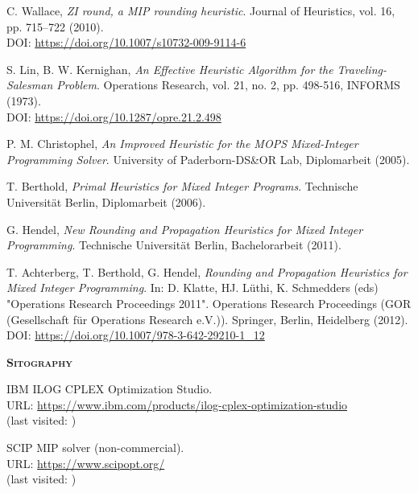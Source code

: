 \documentclass[a4paper,12pt]{book}
\begin{document}
\renewcommand{\listfigurename}{Figures}
\listoffigures
\renewcommand{\listtablename}{Tables}
\listoftables

\nocite{*}
\renewcommand{\bibname}{References}
\begin{thebibliography}{9}
	
	 C. Wallace, \textit{ZI round, a MIP rounding heuristic}. Journal of Heuristics, vol. 16, pp. 715–722 (2010). \\ DOI: \url{https://doi.org/10.1007/s10732-009-9114-6}

	 S. Lin, B. W. Kernighan, \textit{An Effective Heuristic Algorithm for the Traveling-Salesman Problem}. Operations Research, vol. 21, no. 2, pp. 498-516, INFORMS (1973). \\ DOI: \url{https://doi.org/10.1287/opre.21.2.498}

	 P. M. Christophel, \textit{An Improved Heuristic for the MOPS Mixed-Integer Programming Solver}. University of Paderborn-DS\&OR Lab, Diplomarbeit (2005).

	 T. Berthold, \textit{Primal Heuristics for Mixed Integer Programs}. Technische Universität Berlin, Diplomarbeit (2006).

	 G. Hendel, \textit{New Rounding and Propagation Heuristics for Mixed Integer Programming}. Technische Universität Berlin, Bachelorarbeit (2011).

	 T. Achterberg, T. Berthold, G. Hendel, \textit{Rounding and Propagation Heuristics for Mixed Integer Programming}. In: D. Klatte, HJ. Lüthi, K. Schmedders (eds) "Operations Research Proceedings 2011". Operations Research Proceedings (GOR (Gesellschaft für Operations Research e.V.)). Springer, Berlin, Heidelberg (2012). \\ DOI: \url{https://doi.org/10.1007/978-3-642-29210-1_12}
	
	\vspace{0.5cm}
	\textsc{\Large \textbf{Sitography}}

	 IBM ILOG CPLEX Optimization Studio. \\ URL: \url{https://www.ibm.com/products/ilog-cplex-optimization-studio} \\ (last visited: )

	 SCIP MIP solver (non-commercial). \\ URL: \url{https://www.scipopt.org/} \\ (last visited: )


\end{thebibliography}
\end{document}
